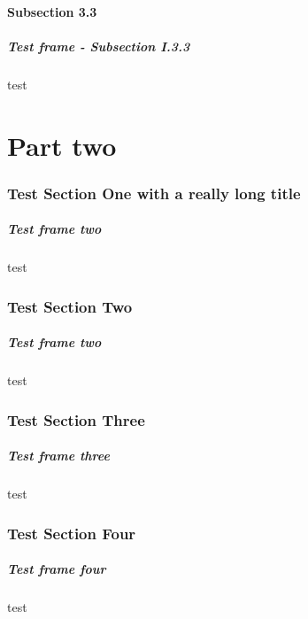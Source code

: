 \documentclass[10pt,compress]{beamer}
\begin{document}
\subsection{Subsection 3.3}
\begin{frame}\frametitle{Test frame - Subsection I.3.3}test\end{frame}

\part{Part two}

\section[Section 1]{Test Section One with a really long title}
\begin{frame}\frametitle{Test frame two}test\end{frame}
\section{Test Section Two}
\begin{frame}\frametitle{Test frame two}test\end{frame}
\section{Test Section Three}
\begin{frame}\frametitle{Test frame three}test\end{frame}
\section{Test Section Four}
\begin{frame}\frametitle{Test frame four}test\end{frame}
\end{document}
